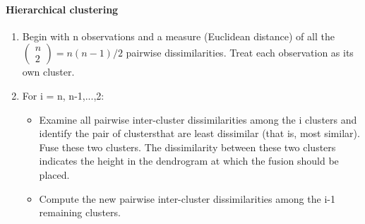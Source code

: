 \documentclass[../document.tex]{subfiles}
\begin{document}
	\paragraph{Hierarchical clustering}
	\begin{center}
		\begin{enumerate}
			\item Begin with n observations and a measure (Euclidean distance) of all the
			\(
			\begin{pmatrix}
			n\\2
			\end{pmatrix} = n(n-1)/2
			\)
			pairwise dissimilarities. Treat each observation as its own cluster.
			\item For i = n, n-1,...,2:
			\begin{itemize}
				\item Examine all pairwise inter-cluster dissimilarities among the i clusters and identify the pair of clustersthat are least dissimilar (that is, most similar). Fuse these two clusters. The dissimilarity between these two clusters indicates the height in the dendrogram at which the fusion should be placed.
				\item Compute the new pairwise inter-cluster dissimilarities among the i-1 remaining clusters.
			\end{itemize}
		\end{enumerate}
	\end{center}
\end{document}
